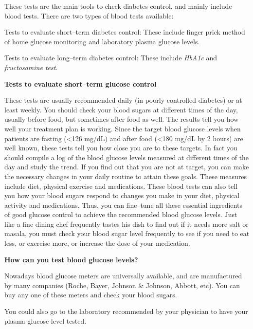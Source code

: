 
These tests are the main tools to check diabetes control, and mainly include blood tests. There are two types of blood tests available:

\item Tests to evaluate short–term diabetes control: These include finger prick method of home glucose monitoring and laboratory plasma glucose levels.

 \item Tests to evaluate long–term diabetes control: These include \textit{HbA1c} and \textit{fructosamine test}.

\textbf{Tests to evaluate short–term glucose control}

These tests are usually recommended daily (in poorly controlled diabetes) or at least weekly. You should check your blood sugars at different times of the day, usually before food, but sometimes after food as well. The results tell you how well your treatment plan is working. Since the target blood glucose levels when patients are fasting (\textless  126 mg/dL) and after food (\textless  180 mg/dL by 2 hours) are well known, these tests tell you how close you are to these targets. In fact you should compile a log of the blood glucose levels measured at different times of the day and study the trend. If you find out that you are not at target, you can make the necessary changes in your daily routine to attain these goals. These measures include diet, physical exercise and medications. These blood tests can also tell you how your blood sugars respond to changes you make in your diet, physical activity and medications. Thus, you can fine–tune all these essential ingredients of good glucose control to achieve the recommended blood glucose levels. Just like a fine dining chef frequently tastes his dish to find out if it needs more salt or masala, you must check your blood sugar level frequently to see if you need to eat less, or exercise more, or increase the dose of your medication.

\textbf{How can you test blood glucose levels?}

Nowadays blood glucose meters are universally available, and are manufactured by many companies (Roche, Bayer, Johnson \& Johnson, Abbott, etc). You can buy any one of these meters and check your blood sugars.

You could also go to the laboratory recommended by your physician to have your plasma glucose level tested.

